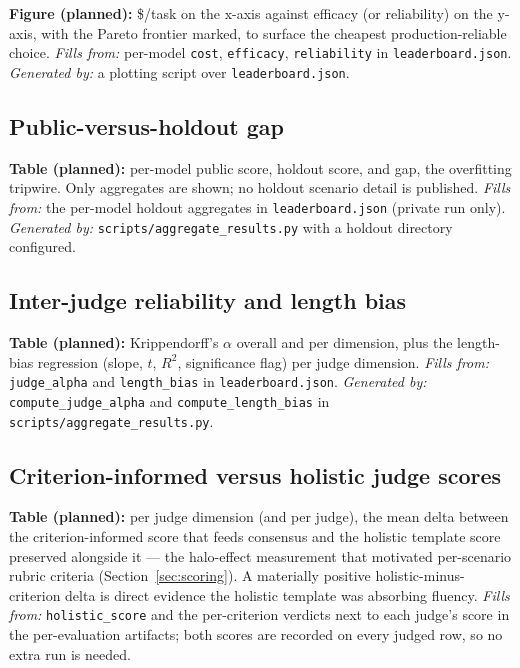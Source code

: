 \textbf{Figure (planned):} \$/task on the x-axis against efficacy (or reliability)
on the y-axis, with the Pareto frontier marked, to surface the cheapest
production-reliable choice. \emph{Fills from:} per-model \texttt{cost},
\texttt{efficacy}, \texttt{reliability} in \texttt{leaderboard.json}.
\emph{Generated by:} a plotting script over \texttt{leaderboard.json}.

\subsection{Public-versus-holdout gap}

\textbf{Table (planned):} per-model public score, holdout score, and gap, the
overfitting tripwire. Only aggregates are shown; no holdout scenario detail is
published. \emph{Fills from:} the per-model holdout aggregates in
\texttt{leaderboard.json} (private run only). \emph{Generated by:}
\texttt{scripts/aggregate\_results.py} with a holdout directory configured.

\subsection{Inter-judge reliability and length bias}

\textbf{Table (planned):} Krippendorff's $\alpha$ overall and per dimension, plus
the length-bias regression (slope, $t$, $R^2$, significance flag) per judge
dimension. \emph{Fills from:} \texttt{judge\_alpha} and \texttt{length\_bias} in
\texttt{leaderboard.json}. \emph{Generated by:} \texttt{compute\_judge\_alpha} and
\texttt{compute\_length\_bias} in \texttt{scripts/aggregate\_results.py}.

\subsection{Criterion-informed versus holistic judge scores}

\textbf{Table (planned):} per judge dimension (and per judge), the mean delta
between the criterion-informed score that feeds consensus and the holistic
template score preserved alongside it --- the halo-effect measurement that
motivated per-scenario rubric criteria (Section~\ref{sec:scoring}). A materially
positive holistic-minus-criterion delta is direct evidence the holistic template
was absorbing fluency. \emph{Fills from:} \texttt{holistic\_score} and the
per-criterion verdicts next to each judge's score in the per-evaluation
artifacts; both scores are recorded on every judged row, so no extra run is
needed.


